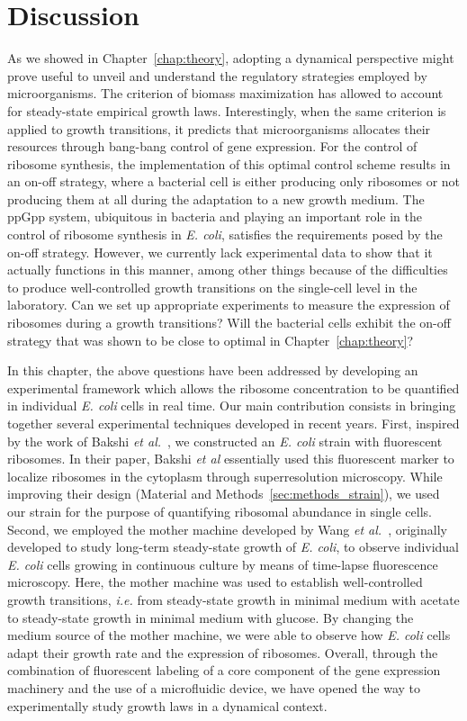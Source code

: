 \section{Discussion}
\label{sec:chap3_discussion}

As we showed in Chapter~\ref{chap:theory}, adopting a dynamical perspective might prove useful to unveil and understand the regulatory strategies employed by microorganisms.
The criterion of biomass maximization has allowed to account for steady-state empirical growth laws.
Interestingly, when the same criterion is applied to growth transitions, it predicts that microorganisms allocates their resources through bang-bang control of gene expression.
For the control of ribosome synthesis, the implementation of this optimal control scheme results in an on-off strategy, where a bacterial cell is either producing only ribosomes or not producing them at all during the adaptation to a new growth medium.
The ppGpp system, ubiquitous in bacteria and playing an important role in the control of ribosome synthesis in \textit{E. coli}, satisfies the requirements posed by the on-off strategy.
However, we currently lack experimental data to show that it actually functions in this manner, among other things because of the difficulties to produce well-controlled growth transitions on the single-cell level in the laboratory.
Can we set up appropriate experiments to measure the expression of ribosomes during a growth transitions?
Will the bacterial cells exhibit the on-off strategy that was shown to be close to optimal in Chapter~\ref{chap:theory}?

In this chapter, the above questions have been addressed by developing an experimental framework which allows the ribosome concentration to be quantified in individual \textit{E. coli} cells in real time.
Our main contribution consists in bringing together several experimental techniques developed in recent years.
First, inspired by the work of Bakshi \textit{et al.}~\cite{bakshi_superresolution_2012}, we constructed an \textit{E. coli} strain with fluorescent ribosomes.
In their paper, Bakshi \textit{et al} essentially used this fluorescent marker to localize ribosomes in the cytoplasm through superresolution microscopy.
While improving their design (Material and Methods~\ref{sec:methods_strain}), we used our strain for the purpose of quantifying ribosomal abundance in single cells.
Second, we employed the mother machine developed by Wang \textit{et al.}~\cite{wang_robust_2010}, originally developed to study long-term steady-state growth of \textit{E. coli}, to observe individual \textit{E. coli} cells growing in continuous culture by means of time-lapse fluorescence microscopy.
Here, the mother machine was used to establish well-controlled growth transitions, \textit{i.e.} from steady-state growth in minimal medium with acetate to steady-state growth in minimal medium with glucose.
By changing the medium source of the mother machine, we were able to observe how \textit{E. coli} cells adapt their growth rate and the expression of ribosomes.
Overall, through the combination of fluorescent labeling of a core component of the gene expression machinery and the use of a microfluidic device, we have opened the way to experimentally study growth laws in a dynamical context.

